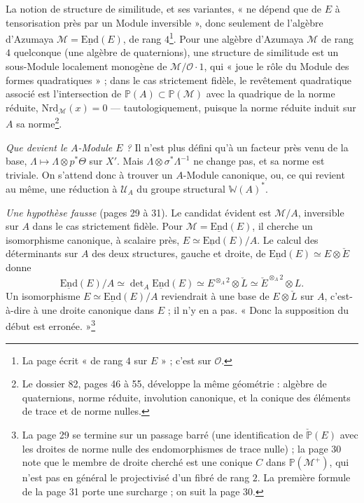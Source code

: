 \documentclass[11pt,a4paper]{article}
\begin{document}
La notion de structure de similitude, et ses variantes, « ne dépend que de $E$ à
tensorisation près par un Module inversible », donc seulement de l'algèbre
d'Azumaya $\mathcal{M} = \underline{\mathrm{End}}(E)$, de rang $4$\footnote{La page écrit
« de rang $4$ sur $E$ » ; c'est sur $\mathcal{O}$.}. Pour une algèbre d'Azumaya
$\mathcal{M}$ de rang $4$ quelconque (une algèbre de quaternions), une structure de
similitude est un sous-Module localement monogène de
$\mathcal{M}/\mathcal{O}\cdot 1$, qui « joue le rôle du Module des formes
quadratiques » ; dans le cas strictement fidèle, le revêtement quadratique associé
est l'intersection de $\mathbb{P}(A) \subset \mathbb{P}(\mathcal{M})$ avec la quadrique
de la norme réduite, $\mathrm{Nrd}_{\mathcal{M}}(x) = 0$ --- tautologiquement, puisque
la norme réduite induit sur $A$ sa norme\footnote{Le dossier 82, pages 46 à 55,
développe la même géométrie : algèbre de quaternions, norme réduite, involution
canonique, et la conique des éléments de trace et de norme nulles.}.

\emph{Que devient le $A$-Module $E$ ?} Il n'est plus défini qu'à un facteur près
venu de la base, $\Lambda \mapsto \Lambda \otimes p^{*}\Theta$ sur $X'$. Mais
$\Lambda \otimes \sigma^{*}\Lambda^{-1}$ ne change pas, et sa norme est triviale. On
s'attend donc à trouver un $A$-Module canonique, ou, ce qui revient au même, une
réduction à $\mathcal{U}_A$ du groupe structural $\mathbb{W}(A)^{*}$.

\emph{Une hypothèse fausse} (pages 29 à 31). Le candidat évident est
$\mathcal{M}/A$, inversible sur $A$ dans le cas strictement fidèle. Pour
$\mathcal{M} = \underline{\mathrm{End}}(E)$, il cherche un isomorphisme canonique,
à scalaire près, $E \simeq \underline{\mathrm{End}}(E)/A$. Le calcul des déterminants
sur $A$ des deux structures, gauche et droite, de $\underline{\mathrm{End}}(E) \simeq E
\otimes \check{E}$ donne
\[
  \underline{\mathrm{End}}(E)/A \simeq \det\nolimits_A \underline{\mathrm{End}}(E) \simeq
  E^{\otimes_A 2} \otimes \check{L} \simeq \check{E}^{\otimes_A 2} \otimes L .
\]
Un isomorphisme $E \simeq \underline{\mathrm{End}}(E)/A$ reviendrait à une base de
$E \otimes \check{L}$ sur $A$, c'est-à-dire à une droite canonique dans $E$ ; il n'y
en a pas. « Donc la supposition du début est erronée. »\footnote{La page 29 se
termine sur un passage barré (une identification de $\check{\mathbb{P}}(E)$ avec les
droites de norme nulle des endomorphismes de trace nulle) ; la page 30 note que
le membre de droite cherché est une conique $C$ dans $\mathbb{P}(\mathcal{M}^{+})$,
qui n'est pas en général le projectivisé d'un fibré de rang $2$. La première
formule de la page 31 porte une surcharge ; on suit la page 30.}
\end{document}
